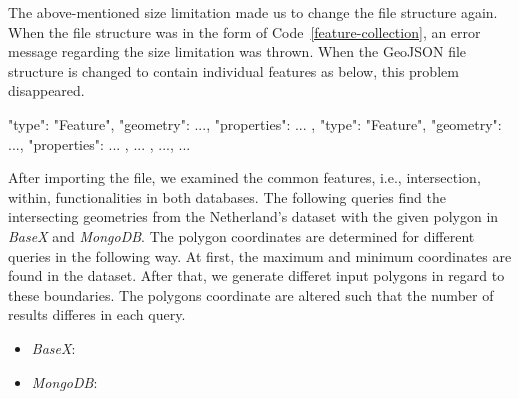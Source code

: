\documentclass[a4paper,12pt]{article}
\begin{document}
The above-mentioned size limitation made us to change the file structure again.
When the file structure was in the form of Code~\ref{feature-collection}, 
an error message regarding the size limitation was thrown. 
When the GeoJSON file structure is changed to contain individual features as below,
this problem disappeared.
\vspace{10px}
\begin{fakeXML}[label=features,caption=A GeoJSON file restructured regarding the size limitation]
    {
      "type": "Feature",
      "geometry": {...},
      "properties": {...}
    },
    {
      "type": "Feature",
      "geometry": {...},
      "properties": {...}
    }, 
    { ... }, ..., { ... }
\end{fakeXML}
\vspace{10px}
After importing the file, we examined the common features, i.e., intersection, within, 
functionalities in both databases.
The following queries find the intersecting geometries from the Netherland's dataset with the given polygon in \textit{BaseX} and \textit{MongoDB}. The polygon coordinates are determined for different queries in the following way. At first, the maximum and minimum coordinates are found in the dataset. After that, we generate differet input polygons in regard to these boundaries. The polygons coordinate are altered such that the number of results differes in each query.

\begin{itemize}
\item \textit{BaseX}:
\item \textit{MongoDB}: 
\end{itemize}
\end{document}
